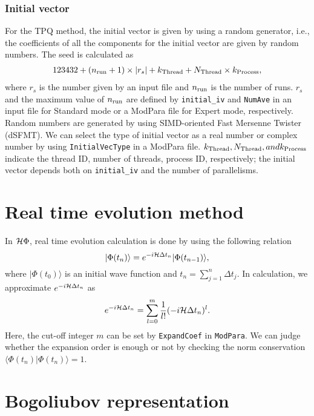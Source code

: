 \subsubsection*{Initial vector}
For the TPQ method, the initial vector is given by using a random generator, i.e., the coefficients of all the components for the initial vector are given by random numbers. The seed is calculated as 
\begin{align}
123432+(n_{\rm run}+1)\times  |r_s|+k_{\rm Thread}+N_{\rm Thread} \times k_{\rm Process},
\end{align}
where $r_s$ is the number given by an input file and $n_{\rm run}$ is the number of runs. $r_s$ and the maximum value of $n_{\rm run}$ are defined by \verb|initial_iv| and \verb|NumAve| in an input file for Standard mode or a ModPara file for Expert mode, respectively. Random numbers are generated by using SIMD-oriented Fast Mersenne Twister (dSFMT)\cite{Mutsuo2008}. We can select the type of initial vector as a real number or complex number by using \verb|InitialVecType| in a ModPara file.
$k_{\rm Thread}, N_{\rm Thread}, and k_{\rm Process}$ indicate 
the thread ID, number of threads, process ID, respectively;
the initial vector depends both on \verb|initial_iv| and the number of parallelisms.

\section{{Real time evolution method}}
\label{Ch:TE}
In ${\cal H}\Phi$, real time evolution calculation is done by using the following relation
\begin{equation}
|\Phi (t_n)\rangle = e^{-i {\cal H}  \Delta t_n}|\Phi (t_{n-1})\rangle,
\end{equation}
where $|\Phi(t_0)\rangle$ is an initial wave function and $t_n = \sum_{j=1}^n  \Delta t_j $.
In calculation, we approximate $e^{-i {\cal H}  \Delta t_n}$ as
\begin{equation}
e^{-i {\cal H}  \Delta t_n} =\sum_{l=0}^m \frac{1}{l!}(-i {\cal H}  \Delta t_n)^l .
\end{equation}
Here, the cut-off integer $m$ can be set by \verb|ExpandCoef| in \verb|ModPara|.
We can judge whether the expansion order is enough or not by checking the norm conservation $\langle \Phi (t_n)|\Phi (t_n)\rangle=1$.

\section{Bogoliubov representation}\label{sec_bogoliubov_rep}


